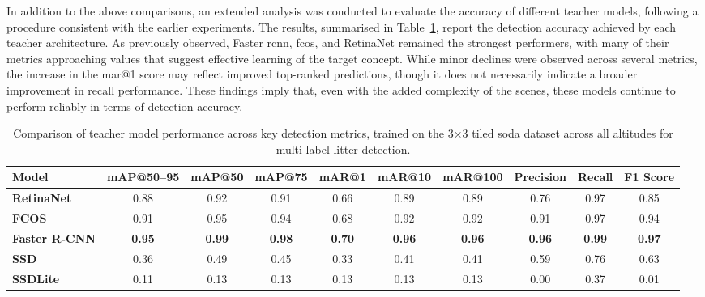 In addition to the above comparisons, an extended analysis was conducted to evaluate the accuracy of different teacher models, following a procedure consistent with the earlier experiments. The results, summarised in Table~\ref{tab:teacher_model_metrics_soda_tiled_multi}, report the detection accuracy achieved by each teacher architecture. As previously observed, Faster \gls{rcnn}, \gls{fcos}, and RetinaNet remained the strongest performers, with many of their metrics approaching values that suggest effective learning of the target concept. While minor declines were observed across several metrics, the increase in the \gls{mar}@1 score may reflect improved top-ranked predictions, though it does not necessarily indicate a broader improvement in recall performance. These findings imply that, even with the added complexity of the scenes, these models continue to perform reliably in terms of detection accuracy.

\begin{table}[!ht]
    \centering
    \begin{adjustbox}{max width=\textwidth}
    \renewcommand{\arraystretch}{1.5}
    \begin{tabular}{|l|c|c|c|c|c|c|c|c|c|}
        \hline
        \textbf{Model} & \textbf{mAP@50--95} & \textbf{mAP@50} & \textbf{mAP@75} & \textbf{mAR@1} & \textbf{mAR@10} & \textbf{mAR@100} & \textbf{Precision} & \textbf{Recall} & \textbf{F1 Score} \\ \hline \hline
        \textbf{RetinaNet} & 0.88 & 0.92 & 0.91 & 0.66 & 0.89 & 0.89 & 0.76 & 0.97 & 0.85 \\\hline
        \textbf{FCOS} & 0.91 & 0.95 & 0.94 & 0.68 & 0.92 & 0.92 & 0.91 & 0.97 & 0.94 \\\hline
        \textbf{Faster R-CNN} & \textbf{0.95} & \textbf{0.99} & \textbf{0.98} & \textbf{0.70} & \textbf{0.96} & \textbf{0.96} & \textbf{0.96} & \textbf{0.99} & \textbf{0.97} \\\hline
        \textbf{SSD} & 0.36 & 0.49 & 0.45 & 0.33 & 0.41 & 0.41 & 0.59 & 0.76 & 0.63 \\\hline
        \textbf{SSDLite} & 0.11 & 0.13 & 0.13 & 0.13 & 0.13 & 0.13 & 0.00 & 0.37 & 0.01 \\
        \hline
    \end{tabular}
    \renewcommand{\arraystretch}{1}
    \end{adjustbox}
    \caption{Comparison of teacher model performance across key detection metrics, trained on the 3$\times$3 tiled \gls{soda} dataset across all altitudes for multi-label litter detection.}
    \label{tab:teacher_model_metrics_soda_tiled_multi}
\end{table}
 

